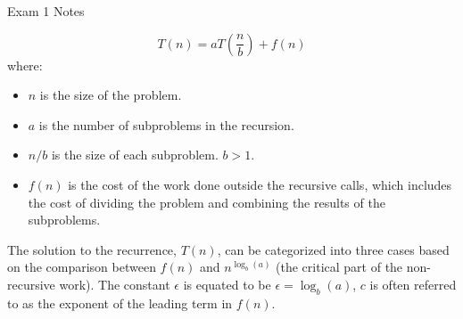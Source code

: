 \begin{examnotes}{Exam 1 Notes}
\begin{highlight}
        \begin{equation*}
            T(n) = aT\left(\frac{n}{b}\right) + f(n)
        \end{equation*}
        where:
    
        \begin{itemize}
            \item $n$ is the size of the problem.
            \item $a$ is the number of subproblems in the recursion.
            \item $n / b$ is the size of each subproblem. $b > 1$.
            \item $f(n)$ is the cost of the work done outside the recursive calls, which includes the cost of dividing the problem and combining the results of the subproblems.
        \end{itemize}
    \end{highlight}

    \begin{highlight}
        The solution to the recurrence, $T(n)$, can be categorized into three cases based on the comparison between $f(n)$ and $n^{\log_{b}{(a)}}$ (the critical part of the non-recursive work). The
        constant $\epsilon$ is equated to be $\epsilon = \log_{b}{(a)}$, $c$ is often referred to as the exponent of the leading term in $f(n)$.


\end{highlight}
\end{examnotes}
